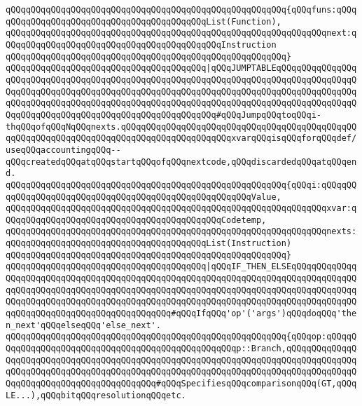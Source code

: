 \verb|qQQqqQQqqQQqqQQqqQQqqQQqqQQqqQQqqQQqqQQqqQQqqQQqqQQqqQQq{qQQqfuns:qQQqqQQqqQQqqQQqqQQqqQQqqQQqqQQqqQQqqQQqqQQqList(Function),|\newline
\verb|qQQqqQQqqQQqqQQqqQQqqQQqqQQqqQQqqQQqqQQqqQQqqQQqqQQqqQQqqQQqqQQqnext:qQQqqQQqqQQqqQQqqQQqqQQqqQQqqQQqqQQqqQQqqQQqInstruction|\newline
\verb|qQQqqQQqqQQqqQQqqQQqqQQqqQQqqQQqqQQqqQQqqQQqqQQqqQQqqQQq}|\newline
\newline
\verb|qQQqqQQqqQQqqQQqqQQqqQQqqQQqqQQqqQQqqQQq|\verb#|qQQqJUMPTABLEqQQqqQQqqQQqqQQqqQQqqQQqqQQqqQQqqQQqqQQqqQQqqQQqqQQqqQQqqQQqqQQqqQQqqQQqqQQqqQQqqQQqqQQqqQQqqQQqqQQqqQQqqQQqqQQqqQQqqQQqqQQqqQQqqQQqqQQqqQQqqQQqqQQqqQQqqQQqqQQqqQQqqQQqqQQqqQQqqQQqqQQqqQQqqQQqqQQqqQQqqQQqqQQqqQQqqQQqqQQqqQQqqQQqqQQqqQQqqQQqqQQqqQQqqQQqqQQqqQQqqQQqqQQq#\verb|#qQQqJumpqQQqtoqQQqi-thqQQqofqQQqNqQQqnexts.qQQqqQQqqQQqqQQqqQQqqQQqqQQqqQQqqQQqqQQqqQQqqQQqqQQqqQQqqQQqqQQqqQQqqQQqqQQqqQQqqQQqqQQqqQQqxvarqQQqisqQQqforqQQqdef/useqQQqaccountingqQQq--qQQqcreatedqQQqatqQQqstartqQQqofqQQqnextcode,qQQqdiscardedqQQqatqQQqend.|\newline
\verb|qQQqqQQqqQQqqQQqqQQqqQQqqQQqqQQqqQQqqQQqqQQqqQQqqQQqqQQq{qQQqi:qQQqqQQqqQQqqQQqqQQqqQQqqQQqqQQqqQQqqQQqqQQqqQQqqQQqqQQqValue,|\newline
\verb|qQQqqQQqqQQqqQQqqQQqqQQqqQQqqQQqqQQqqQQqqQQqqQQqqQQqqQQqqQQqqQQqxvar:qQQqqQQqqQQqqQQqqQQqqQQqqQQqqQQqqQQqqQQqqQQqCodetemp,|\newline
\verb|qQQqqQQqqQQqqQQqqQQqqQQqqQQqqQQqqQQqqQQqqQQqqQQqqQQqqQQqqQQqqQQqnexts:qQQqqQQqqQQqqQQqqQQqqQQqqQQqqQQqqQQqqQQqList(Instruction)|\newline
\verb|qQQqqQQqqQQqqQQqqQQqqQQqqQQqqQQqqQQqqQQqqQQqqQQqqQQqqQQq}|\newline
\newline
\verb|qQQqqQQqqQQqqQQqqQQqqQQqqQQqqQQqqQQqqQQq|\verb#|qQQqIF_THEN_ELSEqQQqqQQqqQQqqQQqqQQqqQQqqQQqqQQqqQQqqQQqqQQqqQQqqQQqqQQqqQQqqQQqqQQqqQQqqQQqqQQqqQQqqQQqqQQqqQQqqQQqqQQqqQQqqQQqqQQqqQQqqQQqqQQqqQQqqQQqqQQqqQQqqQQqqQQqqQQqqQQqqQQqqQQqqQQqqQQqqQQqqQQqqQQqqQQqqQQqqQQqqQQqqQQqqQQqqQQqqQQqqQQqqQQqqQQqqQQqqQQqqQQqqQQqqQQqqQQq#\verb|#qQQqIfqQQq'op'('args')qQQqdoqQQq'then_next'qQQqelseqQQq'else_next'.|\newline
\verb|qQQqqQQqqQQqqQQqqQQqqQQqqQQqqQQqqQQqqQQqqQQqqQQqqQQqqQQq{qQQqop:qQQqqQQqqQQqqQQqqQQqqQQqqQQqqQQqqQQqqQQqqQQqqQQqqQQqp::Branch,qQQqqQQqqQQqqQQqqQQqqQQqqQQqqQQqqQQqqQQqqQQqqQQqqQQqqQQqqQQqqQQqqQQqqQQqqQQqqQQqqQQqqQQqqQQqqQQqqQQqqQQqqQQqqQQqqQQqqQQqqQQqqQQqqQQqqQQqqQQqqQQqqQQqqQQqqQQqqQQqqQQqqQQqqQQqqQQqqQQqqQQq#qQQqSpecifiesqQQqcomparisonqQQq(GT,qQQqLE...),qQQqbitqQQqresolutionqQQqetc.|\newline
